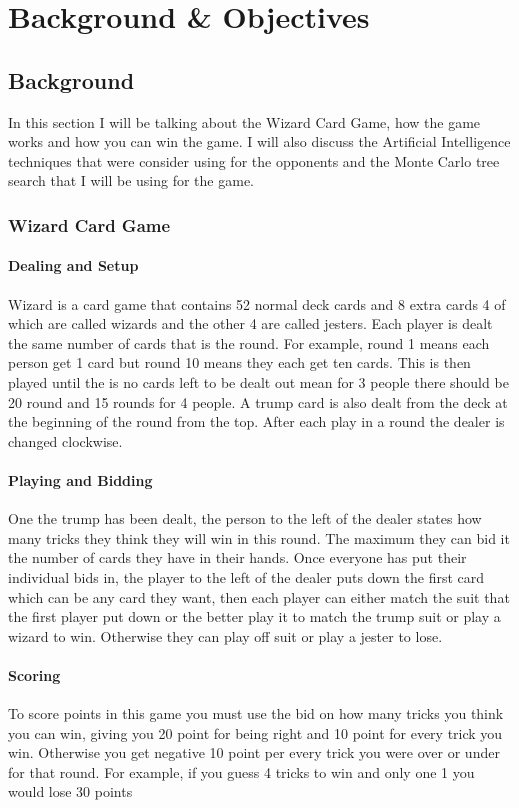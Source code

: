 \chapter{Background \& Objectives}


\section{Background}
In this section I will be talking about the Wizard Card Game, how the game works and how you can win the game. I will also discuss the Artificial Intelligence techniques that were consider using for the opponents and the Monte Carlo tree search that I will be using for the game.
\subsection{Wizard Card Game}
\subsubsection{Dealing and Setup}
Wizard is a card game that contains 52 normal deck cards and 8 extra cards 4 of which are called wizards and the other 4 are called jesters.  Each player is dealt the same number of cards that is the round. For example, round 1 means each person get 1 card but round 10 means they each get ten cards. This is then played until the is no cards left to be dealt out mean for 3 people there should be 20 round and 15 rounds for 4 people.  A trump card is also dealt from the deck at the beginning of the round from the top.  After each play in a round the dealer is changed clockwise.
\subsubsection{Playing and Bidding}
One the trump has been dealt, the person to the left of the dealer states how many tricks they think they will win in this round. The maximum they can bid it the number of cards they have in their hands.  Once everyone has put their individual bids in, the player to the left of the dealer puts down the first card which can be any card they want, then each player can either match the suit that the first player put down or the better play it to match the trump suit or play a wizard to win. Otherwise they can play off suit or play a jester to lose.
\subsubsection{Scoring}
To score points in this game you must use the bid on how many tricks you think you can win, giving you 20 point for being right and 10 point for every trick you win. Otherwise you get negative 10 point per every trick you were over or under for that round.  For example, if you guess 4 tricks to win and only one 1 you would lose 30 points
